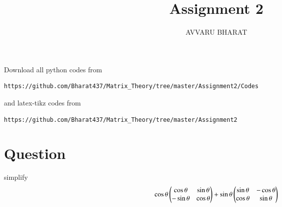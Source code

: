 \documentclass[journal,12pt,twocolumn]{IEEEtran}
\begin{document}
     \def\rightbox#1{\makebox[0in][r]{#1}}
     \def\centbox#1{\makebox[0in]{#1}}
     \def\topbox#1{\raisebox{-\baselineskip}[0in][0in]{#1}}
     \def\midbox#1{\raisebox{-0.5\baselineskip}[0in][0in]{#1}}
\vspace{3cm}
\title{Assignment 2}
\author{AVVARU BHARAT}
\maketitle
\newpage
\bigskip
\renewcommand{\thefigure}{1}
\renewcommand{\thetable}{\theenumi}
Download all python codes from 
\begin{lstlisting}
https://github.com/Bharat437/Matrix_Theory/tree/master/Assignment2/Codes
\end{lstlisting}
%
and latex-tikz codes from 
%
\begin{lstlisting}
https://github.com/Bharat437/Matrix_Theory/tree/master/Assignment2
\end{lstlisting}
\section{\textbf{Question}}
simplify \begin{align}
    \cos\theta\begin{pmatrix}\cos\theta & \sin\theta \\ -\sin\theta & \cos\theta\end{pmatrix}+\sin\theta\begin{pmatrix}\sin\theta & -\cos\theta \\ \cos\theta & \sin\theta\end{pmatrix}\nonumber
\end{align}
\end{document}
